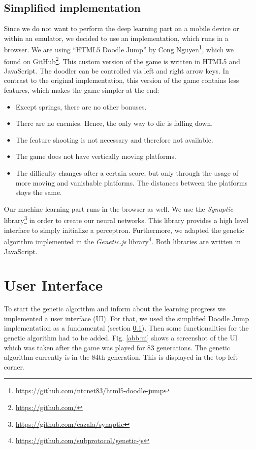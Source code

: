 \documentclass[a4paper,12pt,pagesize,headsepline,bibtotoc,titlepage,abstracton]{scrartcl}
\newcommand{\quot}[1]{{``#1''}}
\begin{document}
\subsection{Simplified implementation}
\label{sec:si}

Since we do not want to perform the deep learning part on a mobile device or within an emulator, we decided to use an implementation, which runs in a browser. We are using \quot{HTML5 Doodle Jump} by Cong Nguyen\footnote{\url{https://github.com/ntcnet83/html5-doodle-jump}}, which we found on GitHub\footnote{\url{https://github.com/}}. This custom version of the game is written in HTML5 and JavaScript. The doodler can be controlled via left and right arrow keys. In contrast to the original implementation, this version of the game contains less features, which makes the game simpler at the end:
\begin{itemize}
\item Except springs, there are no other bonuses.
\item There are no enemies. Hence, the only way to die is falling down.
\item The feature shooting is not necessary and therefore not available.
\item The game does not have vertically moving platforms.
\item The difficulty changes after a certain score, but only through the usage of more moving and vanishable platforms. The distances between the platforms stays the same.
\end{itemize}

Our machine learning part runs in the browser as well. We use the \textit{Synaptic} library\footnote{\url{https://github.com/cazala/synaptic}} in order to create our neural networks. This library provides a high level interface to simply initialize a perceptron. Furthermore, we adapted the genetic algorithm implemented in the \textit{Genetic.js} library\footnote{\url{https://github.com/subprotocol/genetic-js}}. Both libraries are written in JavaScript.


\section{User Interface}

To start the genetic algorithm and inform about the learning progress we implemented a user interface (UI). For that, we used the simplified Doodle Jump implementation as a fundamental (section \ref{sec:si}). Then some functionalities for the genetic algorithm had to be added. Fig. \ref{abb:ui} shows a screenshot of the UI which was taken after the game was played for 83 generations. The genetic algorithm currently is in the 84th generation. This is displayed in the top left corner.
\end{document}
